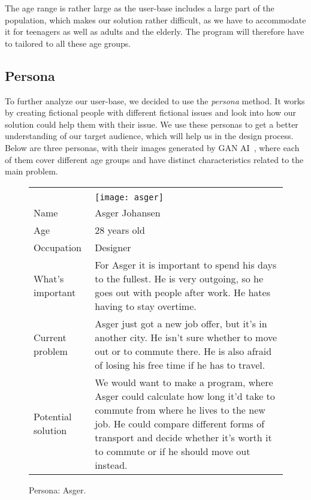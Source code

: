 The age range is rather large as the user-base includes a large part of the population, which makes our solution rather
difficult, as we have to accommodate it for teenagers as well as adults and the elderly.
The program will therefore have to tailored to all these age groups.

\subsection{Persona}\label{subsec:persona}

To further analyze our user-base, we decided to use the \textit{persona} method.
It works by creating fictional people with different fictional issues and look into how our solution could help them
with their issue.
We use these personas to get a better understanding of our target audience, which will help us in the design process.
Below are three personas, with their images generated by GAN AI~\cite{thispersondoesnotexist}, where each of them
cover different age groups and have distinct characteristics related to the main problem.

\renewcommand{\arraystretch}{1.5}

\noindent
\begin{figure}[H]
    \centering
    \begin{tabularx}{\textwidth}{ | l X | }
        \hline
        &                                               \\
        & \texttt{[image: asger]} \\
        Name       & Asger Johansen                                \\
        Age        & 28 years old                                  \\
        Occupation & Designer                                      \\
        What's important & For Asger it is important to spend his days to the fullest.
        He is very outgoing, so he goes out with people after work.
        He hates having to stay overtime. \\
        Current problem & Asger just got a new job offer, but it's in another city.
        He isn't sure whether to move out or to commute there.
        He is also afraid of losing his free time if he has to travel. \\
        Potential solution & We would want to make a program, where Asger could calculate how long it'd take to commute from
        where he lives to the new job.
        He could compare different forms of transport and decide whether it's worth it to commute or if he should move out
        instead. \\
        \hline
    \end{tabularx}
    \caption{Persona: Asger.}
    \label{fig:persona_asger}
\end{figure}

